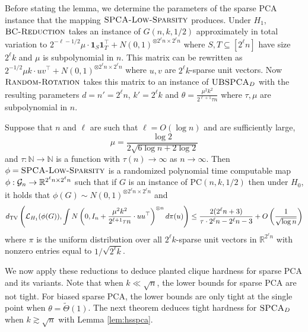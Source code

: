 Before stating the lemma, we determine the parameters of the sparse PCA instance that the mapping $\textsc{SPCA-Low-Sparsity}$ produces. Under $H_1$, $\textsc{BC-Reduction}$ takes an instance of $G(n, k, 1/2)$ approximately in total variation to $2^{-\ell-1/2} \mu \cdot \mathbf{1}_S \mathbf{1}_T^\top + N(0, 1)^{\otimes 2^\ell n \times 2^\ell n}$ where $S, T \subseteq [2^\ell n]$ have size $2^\ell k$ and $\mu$ is subpolynomial in $n$. This matrix can be rewritten as $2^{-1/2} \mu k \cdot uv^\top + N(0, 1)^{\otimes 2^\ell n \times 2^\ell n}$ where $u, v$ are $2^\ell k$-sparse unit vectors. Now $\textsc{Random-Rotation}$ takes this matrix to an instance of $\textsc{UBSPCA}_D$ with the resulting parameters $d = n' = 2^\ell n$, $k' = 2^\ell k$ and $\theta = \frac{\mu^2 k^2}{2^{\ell + 1} \tau n}$ where $\tau, \mu$ are subpolynomial in $n$.

\begin{lemma} \label{lem:lsspca}
Suppose that $n$ and $\ell$ are such that $\ell = O(\log n)$ and are sufficiently large,
$$\mu = \frac{\log 2}{2 \sqrt{6 \log n + 2\log 2}}$$
and $\tau : \mathbb{N} \to \mathbb{N}$ is a function with $\tau(n) \to \infty$ as $n \to \infty$. Then $\phi = \textsc{SPCA-Low-Sparsity}$ is a randomized polynomial time computable map $\phi : \mathcal{G}_n \to \mathbb{R}^{2^\ell n \times 2^\ell n}$ such that if $G$ is an instance of $\text{PC}(n, k, 1/2)$ then under $H_0$, it holds that $\phi(G) \sim N(0, 1)^{\otimes 2^\ell n \times 2^\ell n}$ and
$$d_{\text{TV}}\left( \mathcal{L}_{H_1}(\phi(G)), \int N\left(0, I_n + \frac{\mu^2 k^2}{2^{\ell + 1} \tau n} \cdot uu^\top\right)^{\otimes n} d\pi(u) \right) \le \frac{2(2^\ell n + 3)}{\tau \cdot 2^\ell n - 2^\ell n - 3} + O\left( \frac{1}{\sqrt{\log n}} \right)$$
where $\pi$ is the uniform distribution over all $2^\ell k$-sparse unit vectors in $\mathbb{R}^{2^\ell n}$ with nonzero entries equal to $1/\sqrt{2^\ell k}$.
\end{lemma}

We now apply these reductions to deduce planted clique hardness for sparse PCA and its variants. Note that when $k \ll \sqrt{n}$, the lower bounds for sparse PCA are not tight. For biased sparse PCA, the lower bounds are only tight at the single point when $\theta = \tilde{\Theta}(1)$. The next theorem deduces tight hardness for $\textsc{SPCA}_D$ when $k \gtrsim \sqrt{n}$ with Lemma \ref{lem:hsspca}.

